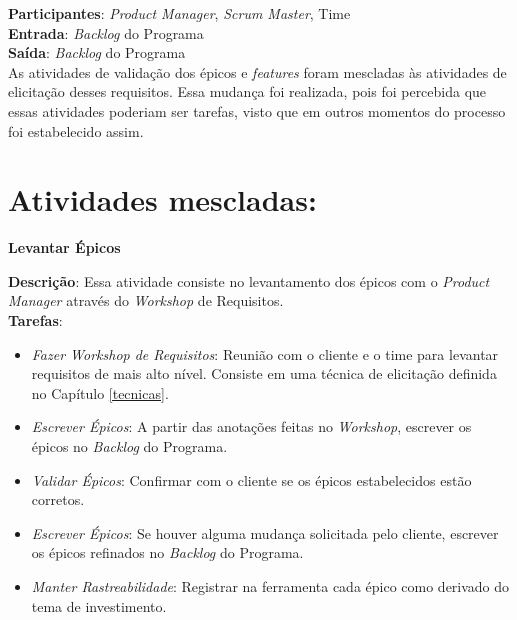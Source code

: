   \textbf{Participantes}: \textit{Product Manager}, \textit{Scrum Master}, Time\\

  \textbf{Entrada}: \textit{Backlog} do Programa \\

  \textbf{Saída}:  \textit{Backlog} do Programa \\

As atividades de validação dos épicos e \textit{features} foram mescladas às atividades de elicitação desses requisitos.
Essa mudança foi realizada, pois foi percebida que essas atividades poderiam ser tarefas, visto que em outros momentos do processo foi estabelecido assim.

\section{Atividades mescladas:}
\textbf{Levantar Épicos}

  \textbf{Descrição}: Essa atividade consiste no levantamento dos épicos com o \textit{Product Manager} através do  \textit{Workshop} de Requisitos. \\

  \textbf{Tarefas}:

  \begin{itemize}
   \item \indent \textit{Fazer Workshop de Requisitos}: Reunião com o cliente e o time para levantar requisitos de mais alto nível. Consiste
   em uma técnica de elicitação definida no Capítulo \ref{tecnicas}.

   \item \indent \textit{Escrever Épicos}: A partir das anotações feitas no \textit{Workshop},
   escrever os épicos no \textit{Backlog} do Programa.
   
   \item \indent \textit{Validar Épicos}: Confirmar com o cliente se os épicos estabelecidos estão corretos.

   \item \indent \textit{Escrever Épicos}: Se houver alguma mudança solicitada pelo cliente, escrever os épicos
   refinados no \textit{Backlog} do Programa.
   
   \item \indent \textit{Manter Rastreabilidade}: Registrar na ferramenta cada épico como derivado do tema de investimento.

  \end{itemize}

